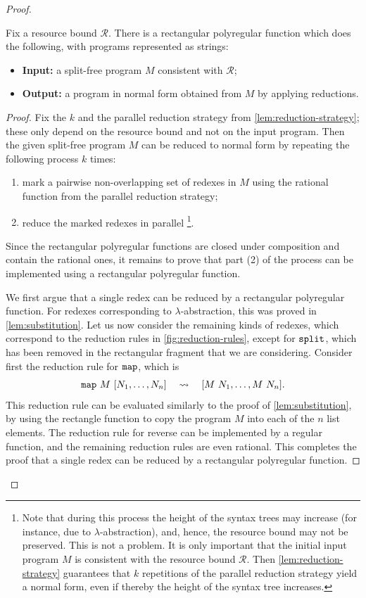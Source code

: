 \documentclass[a4paper,UKenglish,cleveref, autoref, thm-restate]{lipics-v2021}
\newcommand{\Rr}{{\mathcal R}}
\begin{document}
\begin{proof}
    \begin{corollary}\label{cor:normalisation}
        Fix a resource bound $\Rr$. There is a rectangular polyregular function which does the following, with programs represented as strings:
        \begin{itemize}
            \item \textbf{Input:} a split-free program $M$ consistent with  $\Rr$;
            \item \textbf{Output:} a program in normal form obtained from $M$ by applying reductions.
        \end{itemize}
    \end{corollary}
    \begin{proof}
    Fix the $k$ and the parallel reduction strategy from  \cref{lem:reduction-strategy}; these 
 only depend on the resource bound and not on the input program.
 Then the given split-free program $M$ can be reduced to normal form by repeating the following process $k$ times: 
 \begin{enumerate}[(1)]
\item mark a pairwise non-overlapping set of redexes in $M$ using the rational function from the parallel reduction strategy;
\item reduce the marked redexes in parallel \footnote{Note that during this process the height of the syntax trees may increase (for instance, due to $\lambda$-abstraction),
and, hence, the resource bound may not be preserved.
This is not a problem. It is only important that the initial input program $M$ is consistent with the resource bound $\Rr$. Then \cref{lem:reduction-strategy} guarantees that
$k$ repetitions of the parallel reduction strategy yield a normal form, even if thereby the height of the syntax tree increases.}. 
\end{enumerate}
Since the rectangular polyregular functions are closed under composition and contain the rational ones, it remains to prove that part (2) of the process can be implemented using a rectangular polyregular function.
        
        We first argue that a single redex can be reduced by a rectangular polyregular function. For redexes corresponding to $\lambda$-abstraction, this was proved in \cref{lem:substitution}. Let us now consider the remaining kinds of redexes, which correspond to the reduction rules in \cref{fig:reduction-rules}, except for $\mathtt{split}$, which has been removed in the rectangular fragment that we are considering. Consider first the reduction rule for  $\mathtt{map}$, which is 
        \begin{align*}
        \mathtt{map}\  M\  [N_1,\ldots,N_n] 
        \quad \leadsto \quad 
        [M\ N_1, \ldots, M\ N_n].
        \end{align*}
        This reduction rule can be evaluated similarly to the proof of \cref{lem:substitution}, by  using the rectangle function to copy the program $M$ into each of the $n$ list elements. The reduction rule for reverse can be implemented by a regular function, and the remaining reduction rules are even rational. 
 This completes the proof that a single redex can be reduced by a rectangular polyregular function.


\end{proof}
\end{proof}
\end{document}

